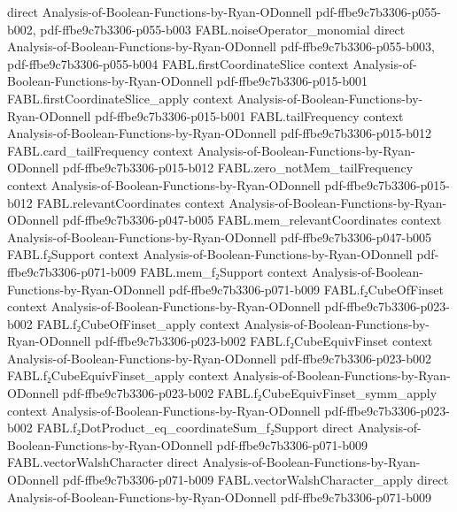 \begin{theorem}
  {direct}
  {Analysis-of-Boolean-Functions-by-Ryan-ODonnell}
  {pdf-ffbe9c7b3306-p055-b002,
    pdf-ffbe9c7b3306-p055-b003}
\proofstep
  {FABL.noiseOperator_monomial}
  {direct}
  {Analysis-of-Boolean-Functions-by-Ryan-ODonnell}
  {pdf-ffbe9c7b3306-p055-b003,
    pdf-ffbe9c7b3306-p055-b004}
\proofstep
  {FABL.firstCoordinateSlice}
  {context}
  {Analysis-of-Boolean-Functions-by-Ryan-ODonnell}
  {pdf-ffbe9c7b3306-p015-b001}
\proofstep
  {FABL.firstCoordinateSlice_apply}
  {context}
  {Analysis-of-Boolean-Functions-by-Ryan-ODonnell}
  {pdf-ffbe9c7b3306-p015-b001}
\proofstep
  {FABL.tailFrequency}
  {context}
  {Analysis-of-Boolean-Functions-by-Ryan-ODonnell}
  {pdf-ffbe9c7b3306-p015-b012}
\proofstep
  {FABL.card_tailFrequency}
  {context}
  {Analysis-of-Boolean-Functions-by-Ryan-ODonnell}
  {pdf-ffbe9c7b3306-p015-b012}
\proofstep
  {FABL.zero_notMem_tailFrequency}
  {context}
  {Analysis-of-Boolean-Functions-by-Ryan-ODonnell}
  {pdf-ffbe9c7b3306-p015-b012}
\proofstep
  {FABL.relevantCoordinates}
  {context}
  {Analysis-of-Boolean-Functions-by-Ryan-ODonnell}
  {pdf-ffbe9c7b3306-p047-b005}
\proofstep
  {FABL.mem_relevantCoordinates}
  {context}
  {Analysis-of-Boolean-Functions-by-Ryan-ODonnell}
  {pdf-ffbe9c7b3306-p047-b005}
\proofstep
  {FABL.f₂Support}
  {context}
  {Analysis-of-Boolean-Functions-by-Ryan-ODonnell}
  {pdf-ffbe9c7b3306-p071-b009}
\proofstep
  {FABL.mem_f₂Support}
  {context}
  {Analysis-of-Boolean-Functions-by-Ryan-ODonnell}
  {pdf-ffbe9c7b3306-p071-b009}
\proofstep
  {FABL.f₂CubeOfFinset}
  {context}
  {Analysis-of-Boolean-Functions-by-Ryan-ODonnell}
  {pdf-ffbe9c7b3306-p023-b002}
\proofstep
  {FABL.f₂CubeOfFinset_apply}
  {context}
  {Analysis-of-Boolean-Functions-by-Ryan-ODonnell}
  {pdf-ffbe9c7b3306-p023-b002}
\proofstep
  {FABL.f₂CubeEquivFinset}
  {context}
  {Analysis-of-Boolean-Functions-by-Ryan-ODonnell}
  {pdf-ffbe9c7b3306-p023-b002}
\proofstep
  {FABL.f₂CubeEquivFinset_apply}
  {context}
  {Analysis-of-Boolean-Functions-by-Ryan-ODonnell}
  {pdf-ffbe9c7b3306-p023-b002}
\proofstep
  {FABL.f₂CubeEquivFinset_symm_apply}
  {context}
  {Analysis-of-Boolean-Functions-by-Ryan-ODonnell}
  {pdf-ffbe9c7b3306-p023-b002}
\proofstep
  {FABL.f₂DotProduct_eq_coordinateSum_f₂Support}
  {direct}
  {Analysis-of-Boolean-Functions-by-Ryan-ODonnell}
  {pdf-ffbe9c7b3306-p071-b009}
\proofstep
  {FABL.vectorWalshCharacter}
  {direct}
  {Analysis-of-Boolean-Functions-by-Ryan-ODonnell}
  {pdf-ffbe9c7b3306-p071-b009}
\proofstep
  {FABL.vectorWalshCharacter_apply}
  {direct}
  {Analysis-of-Boolean-Functions-by-Ryan-ODonnell}
  {pdf-ffbe9c7b3306-p071-b009}
\proofstep

\end{theorem}
